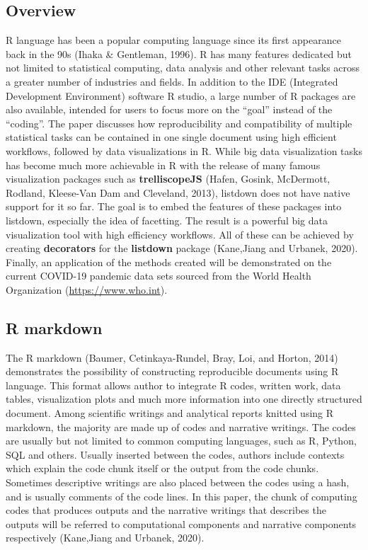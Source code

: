 \documentclass[
]{article}
\begin{document}
\hypertarget{overview}{%
\subsection{Overview}\label{overview}}

R language has been a popular computing language since its first
appearance back in the 90s (Ihaka \& Gentleman, 1996). R has many
features dedicated but not limited to statistical computing, data
analysis and other relevant tasks across a greater number of industries
and fields. In addition to the IDE (Integrated Development Environment)
software R studio, a large number of R packages are also available,
intended for users to focus more on the ``goal'' instead of the
``coding''. The paper discusses how reproducibility and compatibility of
multiple statistical tasks can be contained in one single document using
high efficient workflows, followed by data visualizations in R. While
big data visualization tasks has become much more achievable in R with
the release of many famous visualization packages such as
\textbf{trelliscopeJS} (Hafen, Gosink, McDermott, Rodland, Kleese-Van
Dam and Cleveland, 2013), listdown does not have native support for it
so far. The goal is to embed the features of these packages into
listdown, especially the idea of facetting. The result is a powerful big
data visualization tool with high efficiency workflows. All of these can
be achieved by creating \textbf{decorators} for the \textbf{listdown}
package (Kane,Jiang and Urbanek, 2020). Finally, an application of the
methods created will be demonstrated on the current COVID-19 pandemic
data sets sourced from the World Health Organization
(\url{https://www.who.int}).

\hypertarget{r-markdown}{%
\subsection{R markdown}\label{r-markdown}}

The R markdown (Baumer, Cetinkaya-Rundel, Bray, Loi, and Horton, 2014)
demonstrates the possibility of constructing reproducible documents
using R language. This format allows author to integrate R codes,
written work, data tables, visualization plots and much more information
into one directly structured document. Among scientific writings and
analytical reports knitted using R markdown, the majority are made up of
codes and narrative writings. The codes are usually but not limited to
common computing languages, such as R, Python, SQL and others. Usually
inserted between the codes, authors include contexts which explain the
code chunk itself or the output from the code chunks. Sometimes
descriptive writings are also placed between the codes using a hash, and
is usually comments of the code lines. In this paper, the chunk of
computing codes that produces outputs and the narrative writings that
describes the outputs will be referred to computational components and
narrative components respectively (Kane,Jiang and Urbanek, 2020).
\end{document}
